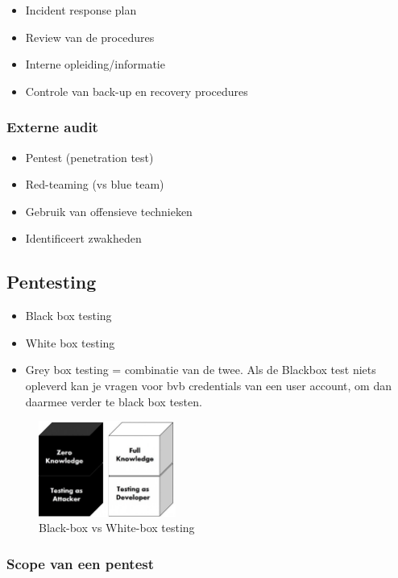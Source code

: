 \documentclass{article}
\begin{document}
\begin{itemize}
    \item Incident response plan
    \item Review van de procedures
    \item Interne opleiding/informatie
    \item Controle van back-up en recovery procedures
\end{itemize}

\subsubsection{Externe audit}

\begin{itemize}
    \item Pentest (penetration test)
    \item Red-teaming (vs blue team)
    \item Gebruik van offensieve technieken
    \item Identificeert zwakheden
\end{itemize}


\subsection{Pentesting}

\begin{itemize}
    \item Black box testing 
    \item White box testing
    \item Grey box testing = combinatie van de twee. Als de Blackbox test niets opleverd kan je vragen voor bvb credentials van een user account, om dan daarmee verder te black box testen.
\end{itemize}

\begin{figure}[H]
    \centering
    \includegraphics[width=0.4\textwidth]{pentesting.jpg}
    \caption{Black-box vs White-box testing}
\end{figure}

\subsubsection{Scope van een pentest}
\end{document}

